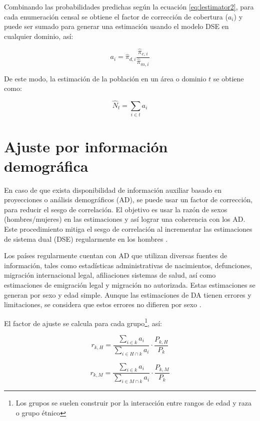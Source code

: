 \documentclass[
  12pt,
]{book}
\begin{document}
Combinando las probabilidades predichas según la ecuación \eqref{eq:lestimator2}, para cada enumeración censal se obtiene el factor de corrección de cobertura (\(a_i\)) y puede ser sumado para generar una estimación usando el modelo DSE en cualquier dominio, así:

\begin{equation}
a_{i} = \hat{\pi}_{d,i} \frac{\hat{\pi}_{c,i}}{\hat{\pi}_{m,i}} 
\label{eq:ccf}
\end{equation}

De este modo, la estimación de la población en un área o dominio \(t\) se obtiene como:

\begin{equation}
\hat{N}_{t} = \sum_{i \in t} a_{i}
\label{eq:ccfdse}
\end{equation}

\section{Ajuste por información demográfica}\label{ajuste-por-informaciuxf3n-demogruxe1fica}

En caso de que exista disponibilidad de información auxiliar basado en proyecciones o análisis demográficos (AD), se puede usar un factor de corrección, para reducir el sesgo de correlación. El objetivo es usar la razón de sexos (hombres/mujeres) en las estimaciones y así lograr una coherencia con los AD. Este procedimiento mitiga el sesgo de correlación al incrementar las estimaciones de sistema dual (DSE) regularmente en los hombres \citep{Konicki2012}.

Los países regularmente cuentan con AD que utilizan diversas fuentes de información, tales como estadísticas administrativas de nacimientos, defunciones, migración internacional legal, afiliaciones sistemas de salud, así como estimaciones de emigración legal y migración no autorizada. Estas estimaciones se generan por sexo y edad simple. Aunque las estimaciones de DA tienen errores y limitaciones, se considera que estos errores no difieren por sexo \citep{zamora2022pesdesign}.

El factor de ajuste se calcula para cada grupo\footnote{Los grupos se suelen construir por la interacción entre rangos de edad y raza o grupo étnico}, así:

\[r_{k,H} = \frac{\sum_{i \in k} a_i}{\sum_{i \in H \cap k} a_i} \cdot \frac{P_{k,H}}{P_k}\]

\[r_{k,M} = \frac{\sum_{i \in k} a_i}{\sum_{i \in M \cap k} a_i} \cdot \frac{P_{k,M}}{P_k}\]
\end{document}
